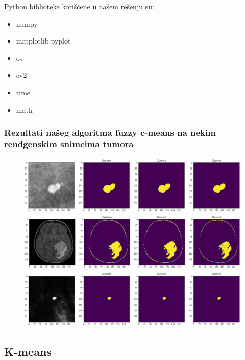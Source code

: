 \documentclass{article}
\begin{document}
{\selectfont Python} biblioteke kori\v{s}\'{c}ene u na\v{s}em re\v{s}enju su:
\selectfont
\begin{itemize}
\item numpy
\item matplotlib.pyplot
\item os
\item cv2
\item time
\item math
\end{itemize}
\selectfont

\newpage

\subsubsection{\selectfont Rezultati na\v{s}eg algoritma {\selectfont fuzzy c-means} na nekim rendgenskim snimcima tumora}



\begin{figure}[h]
\centerline{\includegraphics[scale=0.45]{images/segmented0.png}}
\centerline{\includegraphics[scale=0.45]{images/segmented1.png}}
\centerline{\includegraphics[scale=0.45]{images/segmented2.png}}
\end{figure}

\subsection{\selectfont K-means}
\end{document}
